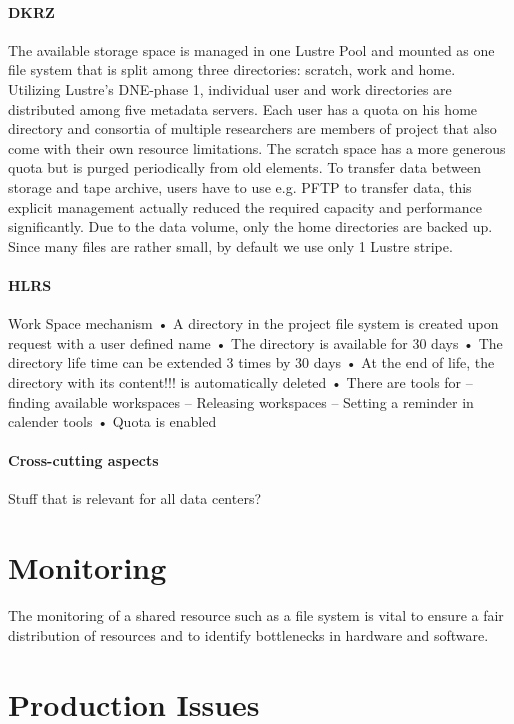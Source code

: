 \documentclass{superfri}
\numberwithin{equation}{section}
\begin{document}
\paragraph{DKRZ}
The available storage space is managed in one Lustre Pool and mounted as one file system that is split among three directories:
scratch, work and home. 
Utilizing Lustre's DNE-phase 1, individual user and work directories are distributed among five metadata servers.
Each user has a quota on his home directory and consortia of multiple researchers are members of project that also come with their own resource limitations.
The scratch space has a more generous quota but is purged periodically from old elements.
To transfer data between storage and tape archive, users have to use e.g. PFTP to transfer data, this explicit management actually reduced the required capacity and performance significantly.
Due to the data volume, only the home directories are backed up.
Since many files are rather small, by default we use only 1 Lustre stripe.


\paragraph{HLRS}
Work Space mechanism
• A directory in the project file system is created upon request
with a user defined name
• The directory is available for 30 days
• The directory life time can be extended 3 times by 30 days
• At the end of life, the directory with its content!!! is
automatically deleted
• There are tools for
– finding available workspaces
– Releasing workspaces
– Setting a reminder in calender tools
• Quota is enabled

\paragraph{Cross-cutting aspects}

Stuff that is relevant for all data centers?

\section{Monitoring}
\label{sec:monitoring}

The monitoring of a shared resource such as a file system is vital to ensure a fair distribution of resources and to identify bottlenecks in hardware and software.


\section{Production Issues}
\label{sec:issues}
\end{document}
